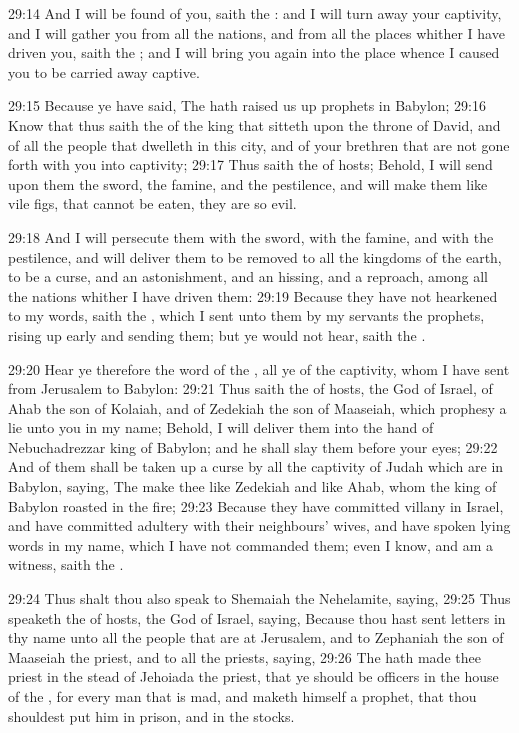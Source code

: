 29:14 And I will be found of you, saith the \LORD: and I will turn away your captivity, and I will gather you from all the nations, and from all the places whither I have driven you, saith the \LORD; and I will bring you again into the place whence I caused you to be carried away captive.

29:15 Because ye have said, The \LORD hath raised us up prophets in Babylon; 29:16 Know that thus saith the \LORD of the king that sitteth upon the throne of David, and of all the people that dwelleth in this city, and of your brethren that are not gone forth with you into captivity; 29:17 Thus saith the \LORD of hosts; Behold, I will send upon them the sword, the famine, and the pestilence, and will make them like vile figs, that cannot be eaten, they are so evil.

29:18 And I will persecute them with the sword, with the famine, and with the pestilence, and will deliver them to be removed to all the kingdoms of the earth, to be a curse, and an astonishment, and an hissing, and a reproach, among all the nations whither I have driven them: 29:19 Because they have not hearkened to my words, saith the \LORD, which I sent unto them by my servants the prophets, rising up early and sending them; but ye would not hear, saith the \LORD.

29:20 Hear ye therefore the word of the \LORD, all ye of the captivity, whom I have sent from Jerusalem to Babylon: 29:21 Thus saith the \LORD of hosts, the God of Israel, of Ahab the son of Kolaiah, and of Zedekiah the son of Maaseiah, which prophesy a lie unto you in my name; Behold, I will deliver them into the hand of Nebuchadrezzar king of Babylon; and he shall slay them before your eyes; 29:22 And of them shall be taken up a curse by all the captivity of Judah which are in Babylon, saying, The \LORD make thee like Zedekiah and like Ahab, whom the king of Babylon roasted in the fire; 29:23 Because they have committed villany in Israel, and have committed adultery with their neighbours' wives, and have spoken lying words in my name, which I have not commanded them; even I know, and am a witness, saith the \LORD.

29:24 Thus shalt thou also speak to Shemaiah the Nehelamite, saying, 29:25 Thus speaketh the \LORD of hosts, the God of Israel, saying, Because thou hast sent letters in thy name unto all the people that are at Jerusalem, and to Zephaniah the son of Maaseiah the priest, and to all the priests, saying, 29:26 The \LORD hath made thee priest in the stead of Jehoiada the priest, that ye should be officers in the house of the \LORD, for every man that is mad, and maketh himself a prophet, that thou shouldest put him in prison, and in the stocks.

